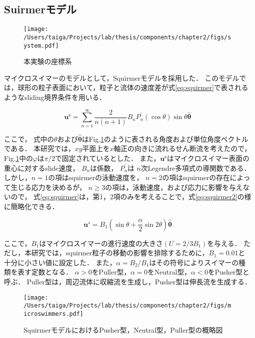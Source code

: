 \subsection{Suirmerモデル}
    \begin{figure}[htbp]
        \centering
        \texttt{[image: /Users/taiga/Projects/lab/thesis/components/chapter2/figs/system.pdf]}
        \caption{本実験の座標系}
        \label{fig:system}
    \end{figure}

マイクロスイマーのモデルとして，Squirmerモデル\cite{squirmer}を採用した．
このモデルでは，球形の粒子表面において，粒子と流体の速度差が式\eqref{eq:squirmer}で表されるようなsliding境界条件を用いる．

    \begin{equation}
        \boldsymbol{u}^\mathrm{s} = 
            \sum_{n=1}^\infty\frac{2}{n(n + 1)} B_n P_n^\prime(\cos{\theta}) \sin{\theta} \hat{\boldsymbol{\theta}}
        \label{eq:squirmer}
    \end{equation}

\noindent
ここで， 式中の$\theta$および$\boldsymbol{\hat{\theta}}$はFig.\ref{fig:system}のように表される角度および単位角度ベクトルである．
本研究では，$xy$平面上を$x$軸正の向きに流れるせん断流を考えたので，
Fig.\ref{fig:system}中の$\varphi$は$\pi / 2$で固定されているとした．
また，$\boldsymbol{u}^\mathrm{s}$はマイクロスイマー表面の重心に対するslide速度，
$B_n$は係数，
$P^\prime_n$は $n$次Legendre多項式の導関数である．
しかし，$n=1$の項はsquirmerの泳動速度を，
$n=2$の項はsquirmerの存在によって生じる応力を決めるが，
$n \geq 3$の項は，泳動速度，および応力に影響を与えないので，
式\eqref{eq:squirmer}は，第1，2項のみを考えることで，式\eqref{eq:squirmer2}の様に簡略化できる．

    \begin{equation}
        \boldsymbol{u}^s =
            B_1 \left( \sin{\theta} + \frac{\alpha}{2} \sin{2\theta} \right) \hat{\boldsymbol{\theta}}
        \label{eq:squirmer2}
    \end{equation}

\noindent
ここで，$B_1$はマイクロスイマーの進行速度の大きさ$(U = 2/3 B_1)$を与える．
ただし，本研究では，squirmer粒子の移動の影響を排除するために，$B_1 = 0.01$と十分に小さい値に設定した．
また，$\alpha = B_2/B_1$はその符号によりスイマーの種類を表す定数となる．
$\alpha > 0$をPuller型，$\alpha = 0$をNeutral型，$\alpha < 0$をPusher型と呼ぶ．
Puller型は，周辺流体に収縮流を生成し，Pusher型は伸長流を生成する．

    \begin{figure}[H]
        \centering
        \texttt{[image: /Users/taiga/Projects/lab/thesis/components/chapter2/figs/microswimmers.pdf]}
        \caption{SquirmerモデルにおけるPusher型，Neutral型，Puller型の概略図}
        \label{fig:squirmermodel}
    \end{figure}
